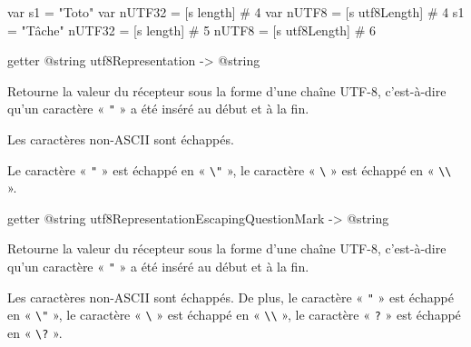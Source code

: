 \begin{galgas3}
 var s1 = "Toto"
 var nUTF32 = [s length] # 4
 var nUTF8  = [s utf8Length] # 4
 s1 = "Tâche"
 nUTF32 = [s length] # 5
 nUTF8  = [s utf8Length] # 6
\end{galgas3}









\begin{galgas3box}
getter @string utf8Representation -> @string
\end{galgas3box}

Retourne la valeur du récepteur sous la forme d'une chaîne UTF-8, c'est-à-dire qu'un caractère « \texttt{"} » a été inséré au début et à la fin.

Les caractères non-ASCII sont échappés.

Le caractère « \texttt{"} » est échappé en « \texttt{\textbackslash"} », le caractère « \texttt{\textbackslash} » est échappé en « \texttt{\textbackslash\textbackslash} ».


















\begin{galgas3box}
getter @string utf8RepresentationEscapingQuestionMark -> @string
\end{galgas3box}

Retourne la valeur du récepteur sous la forme d'une chaîne UTF-8, c'est-à-dire qu'un caractère « \texttt{"} » a été inséré au début et à la fin.

Les caractères non-ASCII sont échappés. De plus, le caractère « \texttt{"} » est échappé en « \texttt{\textbackslash"} », le caractère « \texttt{\textbackslash} » est échappé en « \texttt{\textbackslash\textbackslash} », le caractère « \texttt{?} » est échappé en « \texttt{\textbackslash?} ».










